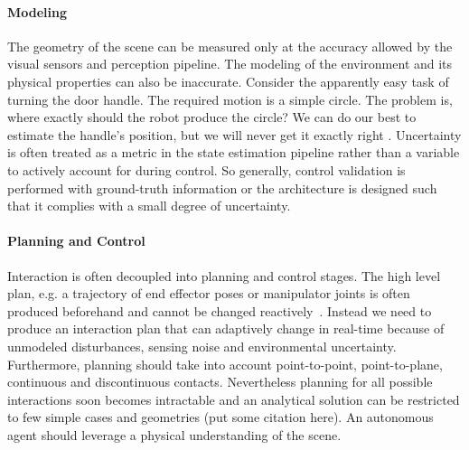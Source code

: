 \paragraph{Modeling} The geometry of the scene can be measured only at the accuracy allowed by the visual sensors and perception pipeline. The modeling of the environment and its physical properties can also be inaccurate. Consider the apparently easy task of turning the door handle. The required motion is a simple circle. The problem is, where exactly should the robot produce the circle? We can do our best to estimate the handle’s position, but we will never get it exactly right \citep{mason2018toward}. Uncertainty is often treated as a metric in the state estimation pipeline rather than a variable to actively account for during control. So generally, control validation is performed with ground-truth information or the architecture is designed such that it complies with a small degree of uncertainty.

\paragraph{Planning and Control} Interaction is often decoupled into planning and control stages. The high level plan, e.g. a trajectory of end effector poses or manipulator joints is often produced beforehand and cannot be changed reactively~\cite{chitta2012moveit}. Instead we need to produce an interaction plan that can adaptively change in real-time because of unmodeled disturbances, sensing noise and environmental uncertainty. Furthermore, planning should take into account point-to-point, point-to-plane, continuous and discontinuous contacts. Nevertheless planning for all possible interactions soon becomes intractable and an analytical solution can be restricted to few simple cases and geometries (put some citation here). An autonomous agent should leverage a physical understanding of the scene.

